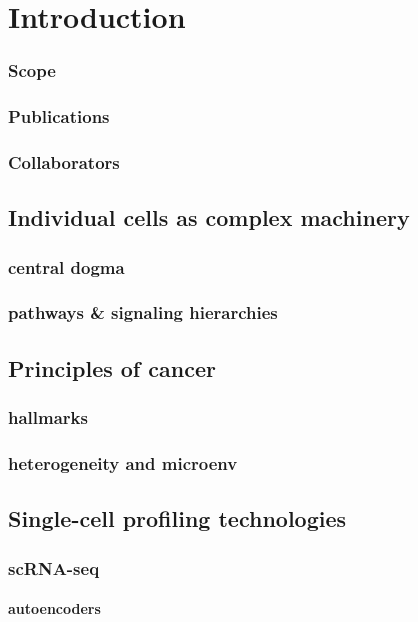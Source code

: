 \chapter{Introduction}
\subsection{Scope}
\subsection{Publications}
\subsection{Collaborators}

\section{Individual cells as complex machinery}
\subsection{central dogma}
\subsection{pathways \& signaling hierarchies}

\section{Principles of cancer}
\subsection{hallmarks}
\subsection{heterogeneity and microenv}

\section{Single-cell profiling technologies}
\subsection{scRNA-seq}
\subsubsection{autoencoders}
